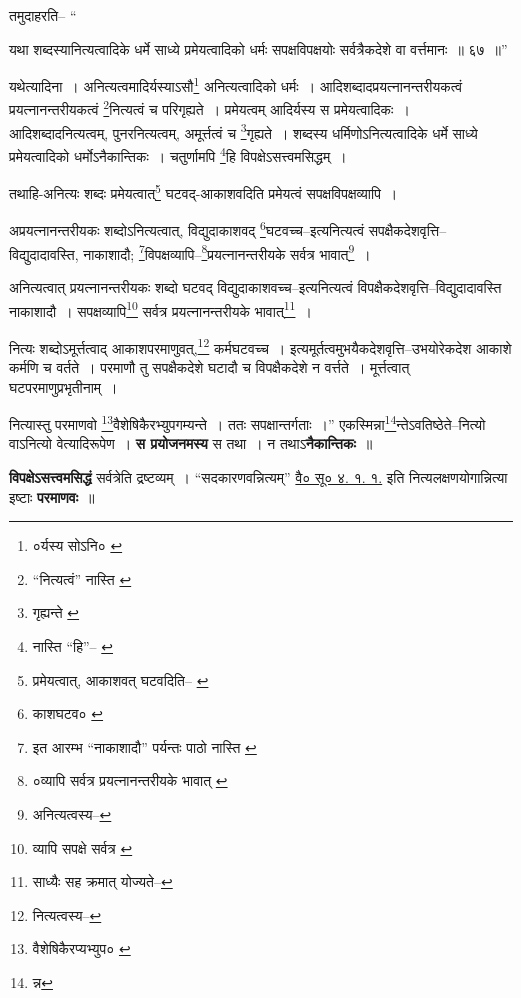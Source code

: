 \documentclass[article,12pt,a4paper]{memoir}
\begin{document}
	तमुदाहरति-- “
	  
	यथा शब्दस्यानित्यत्वादिके धर्मे साध्ये प्रमेयत्वादिको धर्मः सपक्षविपक्षयोः सर्वत्रैकदेशे वा वर्त्तमानः ॥ ६७ ॥” 
	  
	यथेत्यादिना । अनित्यत्वमादिर्यस्याऽसौ\footnote{०र्यस्य सोऽनि० \cite{dp-msA} \cite{dp-msB} \cite{dp-msD} \cite{dp-edP} \cite{dp-edH} \cite{dp-edE} \cite{dp-edN}} अनित्यत्वादिको धर्मः । आदिशब्दादप्रयत्नानन्तरीयकत्वं प्रयत्नानन्तरीयकत्वं \footnote{“नित्यत्वं” नास्ति \cite{dp-msB}}नित्यत्वं च परिगृह्यते । प्रमेयत्वम् आदिर्यस्य स प्रमेयत्वादिकः । आदिशब्दादनित्यत्वम्, पुनरनित्यत्वम्, अमूर्त्तत्वं च \footnote{गृह्यन्ते \cite{dp-msB}}गृह्यते । शब्दस्य धर्मिणोऽनित्यत्वादिके धर्मे साध्ये प्रमेयत्वादिको धर्मोऽनैकान्तिकः । चतुर्णामपि \footnote{नास्ति “हि”--\cite{dp-msA} \cite{dp-msB} \cite{dp-edP} \cite{dp-edH} \cite{dp-edN}}हि विपक्षेऽसत्त्वमसिद्धम् । 
	  
	तथाहि-अनित्यः शब्दः प्रमेयत्वात्\footnote{प्रमेयत्वात्, आकाशवत् घटवदिति--\cite{dp-msA} \cite{dp-msB} \cite{dp-msD} \cite{dp-edP} \cite{dp-edH} \cite{dp-edE} \cite{dp-edN}} घटवद्-आकाशवदिति प्रमेयत्वं सपक्षविपक्षव्यापि । 
	  
	अप्रयत्नानन्तरीयकः शब्दोऽनित्यत्वात्, विद्युदाकाशवद् \footnote{काशघटव० \cite{dp-msA}}घटवच्च--इत्यनित्यत्वं सपक्षैकदेशवृत्ति--विद्युदादावस्ति, नाकाशादौ; \footnote{इत आरम्भ “नाकाशादौ” पर्यन्तः पाठो नास्ति \cite{dp-msB}}विपक्षव्यापि--\footnote{०व्यापि सर्वत्र प्रयत्नानन्तरीयके भावात् \cite{dp-msC}}प्रयत्नानन्तरीयके सर्वत्र भावात्\footnote{अनित्यत्वस्य--\cite{dp-msD-n}} । 
	  
	अनित्यत्वात् प्रयत्नानन्तरीयकः शब्दो घटवद् विद्युदाकाशवच्च--इत्यनित्यत्वं विपक्षैकदेशवृत्ति--विद्युदादावस्ति नाकाशादौ । सपक्षव्यापि\footnote{व्यापि सपक्षे सर्वत्र \cite{dp-msC} \cite{dp-msD}} सर्वत्र प्रयत्नानन्तरीयके भावात्\footnote{साध्यैः सह क्रमात् योज्यते--\cite{dp-msD-n}} । 
	  
	नित्यः शब्दोऽमूर्त्तत्वाद् आकाशपरमाणुवत्,\footnote{नित्यत्वस्य--\cite{dp-msD-n}} कर्मघटवच्च । इत्यमूर्तत्वमुभयैकदेशवृत्ति--उभयोरेकदेश आकाशे कर्मणि च वर्तते । परमाणौ तु सपक्षैकदेशे घटादौ च विपक्षैकदेशे न वर्त्तते । मूर्त्तत्वात् घटपरमाणुप्रभृतीनाम् । 
	  
	नित्यास्तु परमाणवो \footnote{वैशेषिकैरप्यभ्युप० \cite{dp-msC}}वैशेषिकैरभ्युपगम्यन्ते । ततः सपक्षान्तर्गताः ।” एकस्मिन्ना\footnote{न्न}न्तेऽवतिष्ठेते--नित्यो वाऽनित्यो वेत्यादिरूपेण । \textbf{स प्रयोजनमस्य} स तथा । न तथाऽ\textbf{नैकान्तिकः} ॥
	\pend
      

	  \pstart \textbf{विपक्षेऽसत्त्वमसिद्धं} सर्वत्रेति द्रष्टव्यम् । \leavevmode{} “सदकारणवन्नित्यम्” \href{http://http://sarit.indology.info/?cref=vsū.4.1.1}{वै० सू० ४.
	    १. १.} इति नित्यलक्षणयोगान्नित्या इष्टाः \textbf{परमाणवः} ॥
	\pend
      \leavevmode{}
	  \bigskip
	  \begingroup
	
\end{document}
